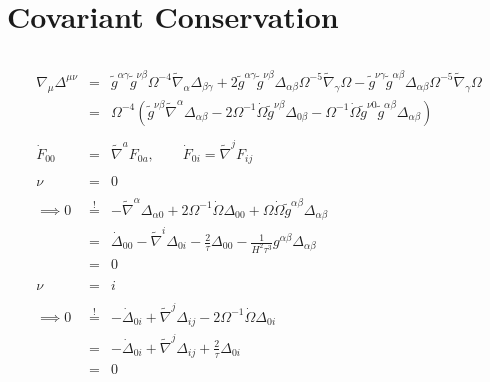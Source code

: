 \documentclass[10pt,letterpaper]{article}
\numberwithin{equation}{section}
\begin{document}
\section{Covariant Conservation}
\begin{eqnarray}
\\ \nonumber\\
\nabla_\mu \Delta^{\mu\nu} &=& \tilde{g}^{\alpha \gamma } \tilde{g}^{\nu \beta } \Omega^{-4} \tilde{\nabla}_{\alpha }\Delta_{\beta \gamma } + 2 \tilde{g}^{\alpha \gamma } \tilde{g}^{\nu \beta } \Delta_{\alpha \beta} \Omega^{-5} \tilde{\nabla}_{\gamma }\Omega -   \tilde{g}^{\nu \gamma }\tilde{g}^{\alpha \beta } \Delta_{\alpha\beta } \Omega^{-5} \tilde{\nabla}_{\gamma }\Omega 
\nonumber\\
&=& \Omega^{-4}(\tilde g^{\nu\beta}\tilde\nabla^\alpha \Delta_{\alpha\beta} - 2\Omega^{-1}\dot\Omega \tilde g^{\nu\beta} \Delta_{0\beta}
-\Omega^{-1}\dot\Omega \tilde g^{\nu 0}\tilde g^{\alpha\beta}\Delta_{\alpha\beta})
\\ \nonumber\\
\dot F_{00} &=& \tilde\nabla^a F_{0a},\qquad \dot F_{0i} = \tilde\nabla^j F_{ij}
\\ \nonumber\\
\nu &=& 0
\\ \nonumber\\
\implies 0&\overset{!}{=}&-\tilde\nabla^\alpha \Delta_{\alpha 0} + 2\Omega^{-1}\dot\Omega \Delta_{00}
+\Omega\dot\Omega \tilde g^{\alpha\beta}\Delta_{\alpha\beta}
\nonumber\\
&=& \dot \Delta_{00} - \tilde\nabla^i \Delta_{0i} - \frac{2}{\tau}\Delta_{00}-\frac{1}{H^2\tau^3} g^{\alpha\beta}\Delta_{\alpha\beta}
\nonumber\\
&=& 0
\\ \nonumber\\
\nu &=& i
\\ \nonumber\\
\implies 0&\overset{!}{=}&-\dot\Delta_{0i}+\tilde\nabla^j \Delta_{ij} -2\Omega^{-1}\dot\Omega \Delta_{0i}
\nonumber\\
&=& -\dot\Delta_{0i}+\tilde\nabla^j \Delta_{ij} +\frac{2}{\tau} \Delta_{0i}
\nonumber\\
&=& 0
\end{eqnarray}
\end{document}
